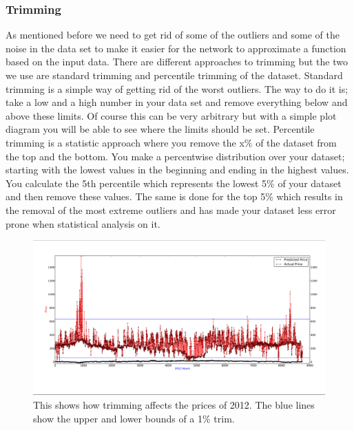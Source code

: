 \subsubsection{Trimming}\label{sec:Trimming}
As mentioned before we need to get rid of some of the outliers and some of the noise in the data set to make it easier for the network to approximate a function based on the input data. There are different approaches to trimming but the two we use are standard trimming and percentile trimming of the dataset. Standard trimming is a simple way of getting rid of the worst outliers. The way to do it is; take a low and a high number in your data set and remove everything below and above these limits. Of course this can be very arbitrary but with a simple plot diagram you will be able to see where the limits should be set. Percentile trimming is a statistic approach where you remove the x\% of the dataset from the top and the bottom. You make a percentwise distribution over your dataset; starting with the lowest values in the beginning and ending in the highest values. You calculate the 5th percentile which represents the lowest 5\% of your dataset and then remove these values. The same is done for the top 5\% which results in the removal of the most extreme outliers and has made your dataset less error prone when statistical analysis on it.
\begin{figure}[!ht]
\centering
\includegraphics[width=\linewidth,natwidth=898,natheight=587]{billeder/trimming_graph.jpg}
\caption{This shows how trimming affects the prices of 2012. The blue lines show the upper and lower bounds of a 1\% trim.}
\label{fig:weight_of_layers}
\end{figure}



